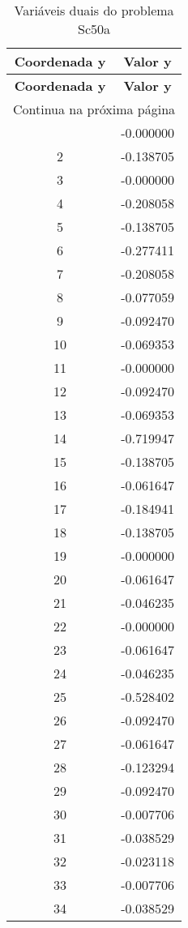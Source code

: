 \documentclass[12pt]{article}
\begin{document}
\begin{longtable}{@{}cc@{}}
\caption{Variáveis duais do problema Sc50a} \\
\toprule
\textbf{Coordenada y} & \textbf{Valor y} \\
\midrule
\endfirsthead

\toprule
\textbf{Coordenada y} & \textbf{Valor y} \\
\midrule
\endhead

\midrule \multicolumn{2}{r}{{Continua na próxima página}} \\ \midrule
\endfoot

\bottomrule
\endlastfoot
1 & -0.000000 \\
2 & -0.138705 \\
3 & -0.000000 \\
4 & -0.208058 \\
5 & -0.138705 \\
6 & -0.277411 \\
7 & -0.208058 \\
8 & -0.077059 \\
9 & -0.092470 \\
10 & -0.069353 \\
11 & -0.000000 \\
12 & -0.092470 \\
13 & -0.069353 \\
14 & -0.719947 \\
15 & -0.138705 \\
16 & -0.061647 \\
17 & -0.184941 \\
18 & -0.138705 \\
19 & -0.000000 \\
20 & -0.061647 \\
21 & -0.046235 \\
22 & -0.000000 \\
23 & -0.061647 \\
24 & -0.046235 \\
25 & -0.528402 \\
26 & -0.092470 \\
27 & -0.061647 \\
28 & -0.123294 \\
29 & -0.092470 \\
30 & -0.007706 \\
31 & -0.038529 \\
32 & -0.023118 \\
33 & -0.007706 \\
34 & -0.038529 \\

\end{longtable}
\end{document}
